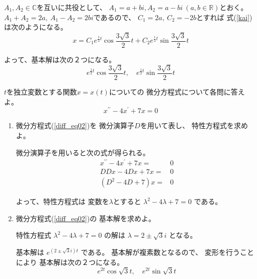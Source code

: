 \documentclass[12pt,b5paper]{ltjsarticle}
\begin{document}
\begin{enumerate}
      $A_1,A_2\in\mathbb{C}$を互いに共役として、
      $A_1=a+bi,A_2=a-bi \ (a,b\in\mathbb{R})$とおく。
      $A_1+A_2=2a,\ A_1-A_2=2bi$であるので、
      $C_1=2a,\ C_2=-2b$とすれば
      式(\ref{kai})は次のようになる。
      \begin{equation}
       x=
        C_1e^{\frac{1}{2}t}\cos{\frac{3\sqrt{3}}{2}t}
        +
        C_2e^{\frac{1}{2}t}\sin{\frac{3\sqrt{3}}{2}t}
      \end{equation}

      よって、基本解は次の２つになる。
      \begin{equation}
       e^{\frac{1}{2}t}\cos{\frac{3\sqrt{3}}{2}t}
        ,\quad
       e^{\frac{1}{2}t}\sin{\frac{3\sqrt{3}}{2}t}
      \end{equation}

      \hrulefill

\end{enumerate}


\hrulefill

$t$を独立変数とする関数$x=x(t)$についての
微分方程式について各問に答えよ。
\begin{equation}
 x^{\prime\prime}- 4x^{\prime}+7x=0
  \label{diff_eq02}
\end{equation}
\begin{enumerate}
 \item
      微分方程式(\ref{diff_eq02})を
      微分演算子$D$を用いて表し、
      特性方程式を求めよ。

      \dotfill

      微分演算子を用いると次の式が得られる。
      \begin{align}
       x^{\prime\prime}- 4x^{\prime}+7x =& 0\\
       DDx-4Dx+7x =& 0\\
       (D^2-4D+7)x =& 0
      \end{align}

      よって、特性方程式は
      変数を$\lambda$とすると
      $\lambda^2-4\lambda+7 = 0$
      である。

      \hrulefill

 \item
      微分方程式(\ref{diff_eq02})の
      基本解を求めよ。

      \dotfill

      特性方程式
      $\lambda^2-4\lambda+7 = 0$
      の解は
      $\lambda= 2\pm \sqrt{3}i$
      となる。

      基本解は
      $e^{\left(2 \pm \sqrt{3}i\right)t}$
      である。
      基本解が複素数となるので、
      変形を行うことにより
      基本解は次の２つになる。
      \begin{equation}
       e^{2t}\cos{\sqrt{3}t}
        ,\quad
       e^{2t}\sin{\sqrt{3}t}
      \end{equation}

      \hrulefill

\end{enumerate}
\end{document}
